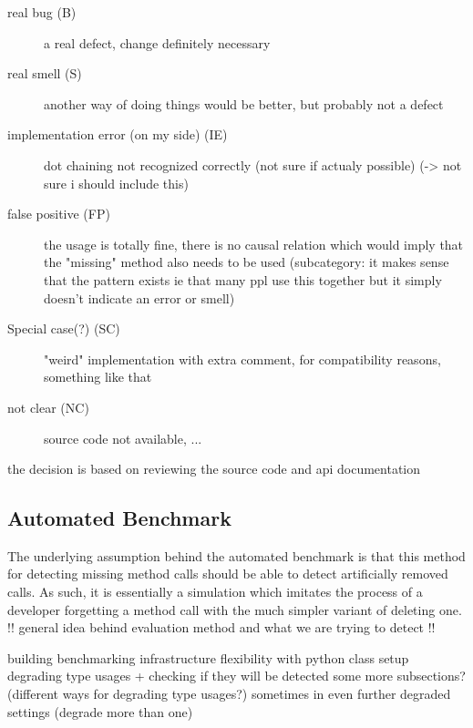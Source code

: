 \begin{description}
    \item [real bug (B)] a real defect, change definitely necessary
    \item [real smell (S)] another way of doing things would be better, but probably not a defect
    \item [implementation error (on my side) (IE)] dot chaining not recognized correctly (not sure if actualy possible) (-> not sure i should include this)
    \item [false positive (FP)] the usage is totally fine, there is no causal relation which would imply that the "missing" method also needs to be used
	(subcategory: it makes sense that the pattern exists ie that many ppl use this together but it simply doesn't indicate an error or smell)
    \item [Special case(?) (SC)] "weird" implementation with extra comment, for compatibility reasons, something like that
    \item [not clear (NC)] source code not available, ...
\end{description}

the decision is based on reviewing the source code and api documentation

\subsection{Automated Benchmark}

The underlying assumption behind the automated benchmark is that this method for detecting missing method calls should be able to detect artificially removed calls.
As such, it is essentially a simulation which imitates the process of a developer forgetting a method call with the much simpler variant of deleting one.
!! general idea behind evaluation method and what we are trying to detect !!

building benchmarking infrastructure
flexibility with python class setup
degrading type usages + checking if they will be detected
    some more subsections? (different ways for degrading type usages?)
    sometimes in even further degraded settings (degrade more than one)

